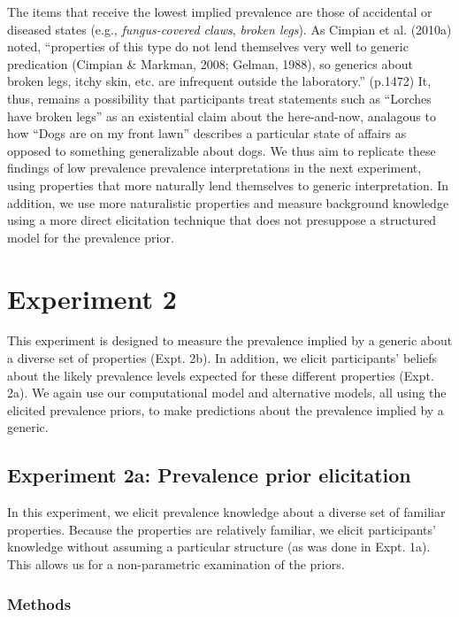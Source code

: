 \documentclass[,man,floatsintext]{apa6}
\theoremstyle{definition}
\theoremstyle{definition}
\theoremstyle{definition}
\theoremstyle{remark}
\begin{document}
The items that receive the lowest implied prevalence are those of
accidental or diseased states (e.g., \emph{fungus-covered claws},
\emph{broken legs}). As Cimpian et al. (2010a) noted,
\enquote{properties of this type do not lend themselves very well to
generic predication (Cimpian \& Markman, 2008; Gelman, 1988), so
generics about broken legs, itchy skin, etc. are infrequent outside the
laboratory.} (p.1472) It, thus, remains a possibility that participants
treat statements such as \enquote{Lorches have broken legs} as an
existential claim about the here-and-now, analagous to how \enquote{Dogs
are on my front lawn} describes a particular state of affairs as opposed
to something generalizable about dogs. We thus aim to replicate these
findings of low prevalence prevalence interpretations in the next
experiment, using properties that more naturally lend themselves to
generic interpretation. In addition, we use more naturalistic properties
and measure background knowledge using a more direct elicitation
technique that does not presuppose a structured model for the prevalence
prior.

\hypertarget{experiment-2}{%
\section{Experiment 2}\label{experiment-2}}

This experiment is designed to measure the prevalence implied by a
generic about a diverse set of properties (Expt. 2b). In addition, we
elicit participants' beliefs about the likely prevalence levels expected
for these different properties (Expt. 2a). We again use our
computational model and alternative models, all using the elicited
prevalence priors, to make predictions about the prevalence implied by a
generic.

\hypertarget{experiment-2a-prevalence-prior-elicitation}{%
\subsection{Experiment 2a: Prevalence prior
elicitation}\label{experiment-2a-prevalence-prior-elicitation}}

In this experiment, we elicit prevalence knowledge about a diverse set
of familiar properties. Because the properties are relatively familiar,
we elicit participants' knowledge without assuming a particular
structure (as was done in Expt. 1a). This allows us for a non-parametric
examination of the priors.

\hypertarget{methods}{%
\subsubsection{Methods}\label{methods}}
\end{document}
